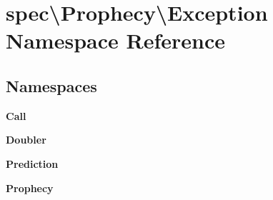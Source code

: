 \section{spec\textbackslash{}Prophecy\textbackslash{}Exception Namespace Reference}
\label{namespacespec_1_1_prophecy_1_1_exception}
\subsection*{Namespaces}
\begin{DoxyCompactItemize}
\item 
 {\bf Call}
\item 
 {\bf Doubler}
\item 
 {\bf Prediction}
\item 
 {\bf Prophecy}
\end{DoxyCompactItemize}
